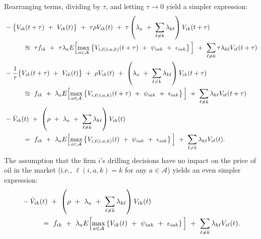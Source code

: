Rearranging terms, dividing by $\tau$, and letting $\tau \rightarrow 0$ yield a simpler expression:
\begin{equation*}
\begin{split}
    & -\big\{ V_{ik} (t + \tau) \ + \ V_{ik} (t) \big\} \ + \ \tau \rho V_{ik} (t) \ + \ \tau \left( \lambda_{a} \ + \ \sum_{\ell \neq k} \lambda_{k\ell} \right) V_{ik}(t + \tau) \\
    & \hspace{1.0cm} \approxeq \ \tau f_{ik} \ + \ \tau \lambda_{a} E\Big[ \underset{a \in \mathcal{A}}{\max} \left\{ V_{i,\ell(i, a, k)} (t + \tau) \ + \ \psi_{iak} \ + \ \epsilon_{iak} \right\} \Big] \ + \ \sum_{\ell \neq k} \tau \lambda_{k\ell} V_{i\ell}(t + \tau) \\
    & -\frac{1}{\tau} \big\{ V_{ik} (t + \tau) \ + \ V_{ik} (t) \big\} \ + \ \rho V_{ik}(t) \ + \ \left( \lambda_{a} \ + \ \sum_{\ell \neq k} \lambda_{k\ell} \right) V_{ik}(t + \tau) \\
    & \hspace{1.0cm} \approxeq \ f_{ik} \ + \ \lambda_{a} E\Big[ \underset{a \in \mathcal{A}}{\max} \left\{ V_{i,\ell(i, a, k)} (t + \tau) \ + \ \psi_{iak} \ + \ \epsilon_{iak} \right\} \Big] \ + \ \sum_{\ell \neq k} \lambda_{k\ell} V_{i\ell}(t + \tau) \\
    & -\dot{V}_{ik} (t) \ + \ \left( \rho \ + \ \lambda_{a} \ + \ \sum_{\ell \neq k} \lambda_{k\ell} \right) V_{ik}(t) \\
    & \hspace{1.0cm} = \ f_{ik} \ + \ \lambda_{a} E\Big[ \underset{a \in \mathcal{A}}{\max} \left\{ V_{i,\ell(i, a, k)} (t) \ + \ \psi_{iak} \ + \ \epsilon_{iak} \right\} \Big] \ + \ \sum_{\ell \neq k} \lambda_{k\ell} V_{i\ell}(t).
\end{split}
\end{equation*}
The assumption that the firm $i$'s drilling decisions have no impact on the price of oil in the market (i.e., $\ell(i, a, k) = k$ for any $a \in \mathcal{A}$) yields an even simpler expression:
\begin{equation*}
\begin{split}
    & -\dot{V}_{ik} (t) \ + \ \left( \rho \ + \ \lambda_{a} \ + \ \sum_{\ell \neq k} \lambda_{k\ell} \right) V_{ik}(t) \\
    & \hspace{1.0cm} = \ f_{ik} \ + \ \lambda_{a} E\Big[ \underset{a \in \mathcal{A}}{\max} \left\{ V_{ik} (t) \ + \ \psi_{iak} \ + \ \epsilon_{iak} \right\} \Big] \ + \ \sum_{\ell \neq k} \lambda_{k\ell} V_{i\ell}(t).
\end{split}
\end{equation*}
